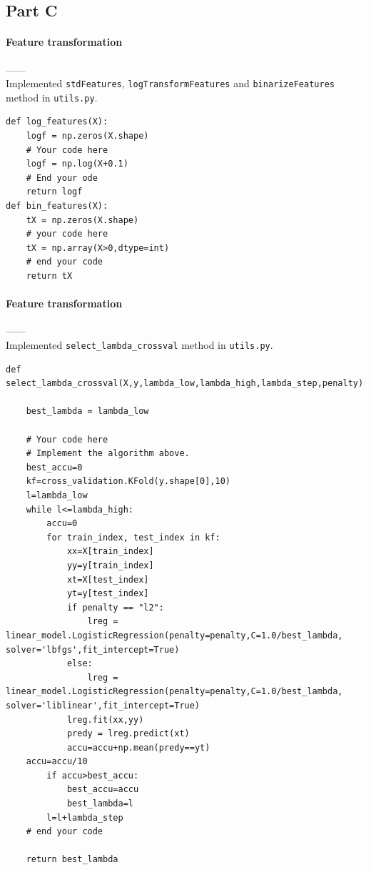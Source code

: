 \documentclass{article}
\begin{document}
\subsection{Part C}

\paragraph{Feature transformation\\}
------\\

Implemented \verb|stdFeatures|, \verb|logTransformFeatures| and \verb|binarizeFeatures| method  in \verb|utils.py|.


\begin{tiny}
\begin{lstlisting}
def log_features(X):
    logf = np.zeros(X.shape)
    # Your code here
    logf = np.log(X+0.1)
    # End your ode
    return logf
def bin_features(X):
    tX = np.zeros(X.shape)
    # your code here
    tX = np.array(X>0,dtype=int)
    # end your code
    return tX
\end{lstlisting}
\end{tiny}

\paragraph{Feature transformation\\}
------\\

Implemented \verb|select_lambda_crossval| method  in \verb|utils.py|.
\begin{tiny}
\begin{lstlisting}
def select_lambda_crossval(X,y,lambda_low,lambda_high,lambda_step,penalty):

    best_lambda = lambda_low

    # Your code here
    # Implement the algorithm above.
    best_accu=0
    kf=cross_validation.KFold(y.shape[0],10)
    l=lambda_low
    while l<=lambda_high:    
        accu=0
        for train_index, test_index in kf:
            xx=X[train_index]
            yy=y[train_index]
            xt=X[test_index]
            yt=y[test_index]
            if penalty == "l2":
                lreg = linear_model.LogisticRegression(penalty=penalty,C=1.0/best_lambda, solver='lbfgs',fit_intercept=True)
            else:
                lreg = linear_model.LogisticRegression(penalty=penalty,C=1.0/best_lambda, solver='liblinear',fit_intercept=True)
            lreg.fit(xx,yy)
            predy = lreg.predict(xt)
            accu=accu+np.mean(predy==yt)
	accu=accu/10
        if accu>best_accu:
            best_accu=accu
            best_lambda=l
        l=l+lambda_step
    # end your code

    return best_lambda

\end{lstlisting}
\end{tiny}
\end{document}
